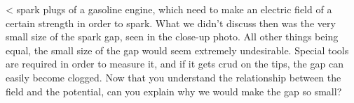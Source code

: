 <%
spark plugs of a gasoline engine, which need to make an electric field of a certain
strength in order to spark. What we didn't discuss then was the very small size of the spark
gap, seen in the close-up photo. All other things being equal, the small size of the
gap would seem extremely undesirable. Special tools are required in order to measure it,
and if it gets crud on the tips, the gap can easily become clogged. Now that you
understand the relationship between the field and the potential, can you explain why
we would make the gap so small?

